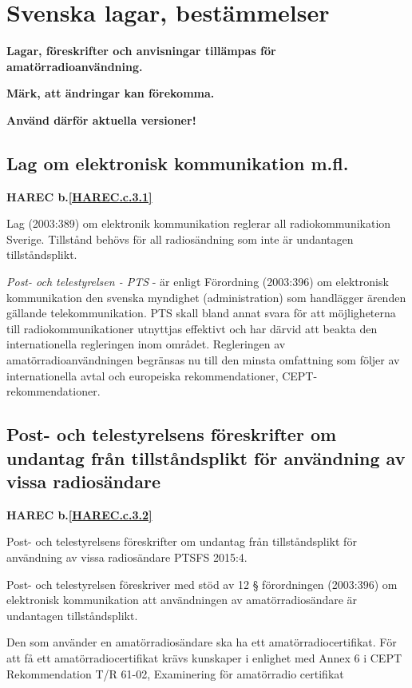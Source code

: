 \section{Svenska lagar, bestämmelser}


\textbf{Lagar, föreskrifter och anvisningar tillämpas för
  amatörradioanvändning.}

\textbf{Märk, att ändringar kan förekomma.}

\textbf{Använd därför aktuella versioner!}


\subsection{Lag om elektronisk kommunikation m.fl.}
\textbf{
HAREC b.\ref{HAREC.c.3.1}\label{myHAREC.c.3.1}
}

Lag (2003:389) om elektronik kommunikation reglerar all radiokommunikation Sverige. Tillstånd behövs för all radiosändning som inte är undantagen
tillståndsplikt.

\emph{Post- och telestyrelsen - PTS} - är enligt Förordning (2003:396) om
elektronisk kommunikation den svenska myndighet (administration) som handlägger
ärenden gällande telekommunikation. PTS skall bland annat svara för att
möjligheterna till radiokommunikationer utnyttjas effektivt och har därvid att
beakta den internationella regleringen inom området. Regleringen av
amatörradioanvändningen begränsas nu till den minsta omfattning som
följer av internationella avtal och europeiska rekommendationer,
CEPT-rekommendationer.

\subsection{Post- och telestyrelsens föreskrifter om undantag från tillståndsplikt för användning av vissa radiosändare}
\textbf{
HAREC b.\ref{HAREC.c.3.2}\label{myHAREC.c.3.2}
}

Post- och telestyrelsens föreskrifter om undantag från tillståndsplikt för
användning av vissa radiosändare PTSFS 2015:4.

Post- och telestyrelsen föreskriver med stöd av 12 § förordningen (2003:396)
om elektronisk kommunikation att användningen av amatörradiosändare är
undantagen tillståndsplikt.

Den som använder en amatörradiosändare ska ha ett amatörradiocertifikat. För
att få ett amatörradiocertifikat krävs kunskaper i enlighet med Annex 6 i 
CEPT Rekommendation T/R 61-02, Examinering för amatörradio certifikat

